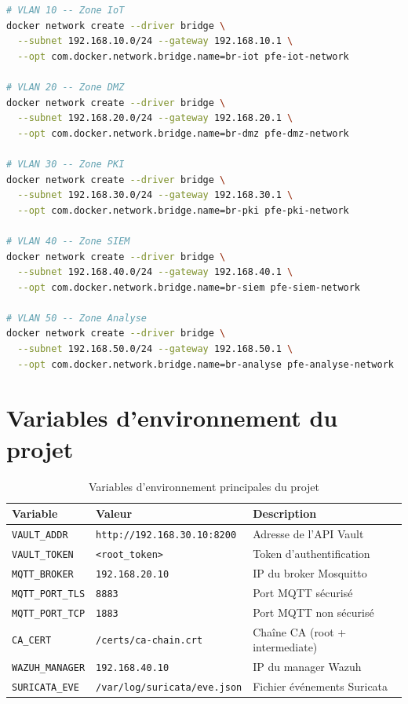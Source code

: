 \begin{lstlisting}[language=bash, caption={Création des réseaux Docker par zone de sécurité}, label={lst:docker_networks}]
# VLAN 10 -- Zone IoT
docker network create --driver bridge \
  --subnet 192.168.10.0/24 --gateway 192.168.10.1 \
  --opt com.docker.network.bridge.name=br-iot pfe-iot-network

# VLAN 20 -- Zone DMZ
docker network create --driver bridge \
  --subnet 192.168.20.0/24 --gateway 192.168.20.1 \
  --opt com.docker.network.bridge.name=br-dmz pfe-dmz-network

# VLAN 30 -- Zone PKI
docker network create --driver bridge \
  --subnet 192.168.30.0/24 --gateway 192.168.30.1 \
  --opt com.docker.network.bridge.name=br-pki pfe-pki-network

# VLAN 40 -- Zone SIEM
docker network create --driver bridge \
  --subnet 192.168.40.0/24 --gateway 192.168.40.1 \
  --opt com.docker.network.bridge.name=br-siem pfe-siem-network

# VLAN 50 -- Zone Analyse
docker network create --driver bridge \
  --subnet 192.168.50.0/24 --gateway 192.168.50.1 \
  --opt com.docker.network.bridge.name=br-analyse pfe-analyse-network
\end{lstlisting}

\section{Variables d'environnement du projet}
\label{sec:config_env}

\begin{table}[H]
\centering
\caption{Variables d'environnement principales du projet}
\label{tab:env_vars}
\begin{tabular}{llp{6cm}}
\toprule
\textbf{Variable} & \textbf{Valeur} & \textbf{Description} \\
\midrule
\texttt{VAULT\_ADDR} & \texttt{http://192.168.30.10:8200} & Adresse de l'API Vault \\
\texttt{VAULT\_TOKEN} & \texttt{<root\_token>} & Token d'authentification \\
\texttt{MQTT\_BROKER} & \texttt{192.168.20.10} & IP du broker Mosquitto \\
\texttt{MQTT\_PORT\_TLS} & \texttt{8883} & Port MQTT sécurisé \\
\texttt{MQTT\_PORT\_TCP} & \texttt{1883} & Port MQTT non sécurisé \\
\texttt{CA\_CERT} & \texttt{/certs/ca-chain.crt} & Chaîne CA (root + intermediate) \\
\texttt{WAZUH\_MANAGER} & \texttt{192.168.40.10} & IP du manager Wazuh \\
\texttt{SURICATA\_EVE} & \texttt{/var/log/suricata/eve.json} & Fichier événements Suricata \\
\bottomrule
\end{tabular}
\end{table}

